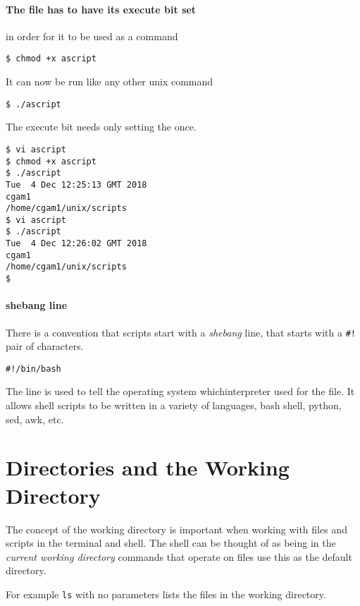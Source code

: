 \documentclass[12pt,a4paper]{article}
\begin{document}
\paragraph{The file has to have its execute bit set } in order for it
to be used as a command
\begin{terminal}
\begin{verbatim}
$ chmod +x ascript
\end{verbatim}
\end{terminal}
It can now be run like any other unix command
\begin{terminal}
\begin{verbatim}
$ ./ascript
\end{verbatim}
\end{terminal}
The execute bit needs only setting the once.

\begin{terminal}
\begin{verbatim}
$ vi ascript
$ chmod +x ascript
$ ./ascript
Tue  4 Dec 12:25:13 GMT 2018
cgam1
/home/cgam1/unix/scripts
$ vi ascript
$ ./ascript
Tue  4 Dec 12:26:02 GMT 2018
cgam1
/home/cgam1/unix/scripts
$
\end{verbatim}
\end{terminal}

\paragraph{shebang line}
There is a convention that scripts start with a \emph{shebang} line, that
starts with a \verb'#!' pair of characters.
\begin{code}
\begin{verbatim}
#!/bin/bash
\end{verbatim}
\end{code}
The line is used to tell the operating system whichinterpreter used for the
file.  It allows shell scripts to be written in a variety of languages, bash
shell, python, sed, awk, etc.

\section{Directories and the Working Directory}
The concept of the working directory is important when working with files and
scripts in the terminal and shell.  The shell can be thought of as being in the
\emph{current working directory} commands that operate on files use this as the
default directory.

For example \texttt{ls} with no parameters lists the files in the working
directory.
\end{document}
